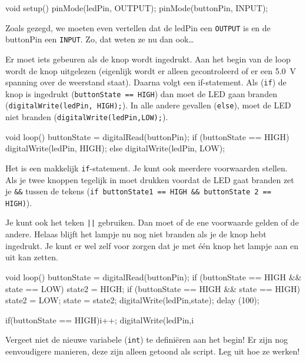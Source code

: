 \documentclass{arduino}
\begin{document}
\begin{marginlisting}
void setup() {
  pinMode(ledPin, OUTPUT);
  pinMode(buttonPin, INPUT);
}
\end{marginlisting}

Zoals gezegd, we moeten even vertellen dat de ledPin een \lstinline{OUTPUT} is en de buttonPin een \lstinline{INPUT}. Zo, dat weten ze nu dan ook\dots

Er moet iets gebeuren als de knop wordt ingedrukt. Aan het begin van de loop wordt de knop uitgelezen (eigenlijk wordt er alleen gecontroleerd of er een \SI{5.0}{\volt} spanning over de weerstand staat). Daarna volgt een if-statement. Als (\lstinline{if}) de knop is ingedrukt (\lstinline{buttonState == HIGH}) dan moet de LED gaan branden (\lstinline{digitalWrite(ledPin, HIGH);}). In alle andere gevallen (\lstinline{else}), moet de LED niet branden (\lstinline{digitalWrite(ledPin,LOW);}).

\begin{marginlisting}
void loop() {
  buttonState = digitalRead(buttonPin);
  if (buttonState == HIGH) {
    digitalWrite(ledPin, HIGH);
  }
  else {
    digitalWrite(ledPin, LOW);
  }
}
\end{marginlisting}

Het is een makkelijk \lstinline{if}-statement. Je kunt ook meerdere voorwaarden stellen. Als je twee knoppen tegelijk in moet drukken voordat de LED gaat branden zet je \lstinline{&&} tussen de tekens (\lstinline{if buttonState1 == HIGH && buttonState 2 == HIGH)}).

Je kunt ook het teken \lstinline{||} gebruiken. Dan moet of de ene voorwaarde gelden of de andere. Helaas blijft het lampje nu nog niet branden als je de knop hebt ingedrukt. Je kunt er wel zelf voor zorgen dat je met één knop het lampje aan en uit kan zetten. 

\begin{marginlisting}
void loop() {
  buttonState = digitalRead(buttonPin);
  if (buttonState == HIGH && state == LOW) {
    state2 = HIGH;
    }
  if (buttonState == HIGH && state == HIGH) {
    state2 = LOW;
    }
  state = state2;
  digitalWrite(ledPin,state);
  delay (100);
}
\end{marginlisting}


\begin{marginlisting}
if(buttonState == HIGH){i++;}
digitalWrite(ledPin,i%
\end{marginlisting}
Vergeet niet de nieuwe variabele (\lstinline{int}) te definiëren aan het begin! Er zijn nog eenvoudigere manieren, deze zijn alleen getoond als script. Leg uit hoe ze werken! 
\end{document}

